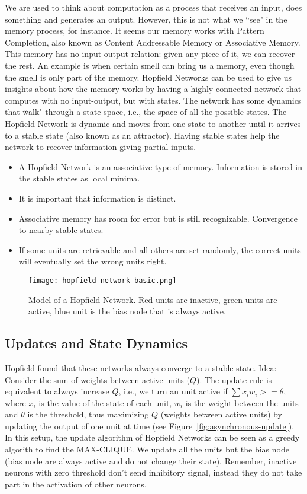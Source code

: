 \documentclass[main]{subfiles}
\begin{document}
We are used to think about computation as a process that receives an input, does something and generates an output.
However, this is not what we ``see" in the memory process, for instance.
It seems our memory works with Pattern Completion, also known as Content Addressable Memory or Associative Memory.
This memory has no input-output relation: given any piece of it, we can recover the rest.
An example is when certain smell can bring us a memory, even though the smell is only part of the memory.
Hopfield Networks can be used to give us insights about how the memory works by having a highly connected network that computes with no input-output, but with states.
The network has some dynamics that \"walk" through a state space, i.e., the space of all the possible states. The Hopfield Network is dynamic and moves from one state to another until it arrives to a stable state (also known as an attractor). Having stable states help the network to recover information giving partial inputs.


\begin{itemize}[noitemsep,nolistsep]
	\item A Hopfield Network is an associative type of memory. Information is stored in the stable states as local minima.
	\item It is important that information is distinct.
	\item Associative memory has room for error but is still recognizable. Convergence to nearby stable states.
	\item If some units are retrievable and all others are set randomly, the correct units will eventually set the wrong units right.
\end{itemize}

\begin{figure}[H]
	\centering
	\texttt{[image: hopfield-network-basic.png]}
	\caption{Model of a Hopfield Network. Red units are inactive, green units are active, blue unit is the bias node that is always active.}
\end{figure}

\subsection{Updates and State Dynamics}

Hopfield found that these networks always converge to a stable state.
Idea: Consider the sum of weights between active units ($Q$).
The update rule is equivalent to always increase $Q$, i.e., we turn an unit active if $\sum x_i w_i >= \theta$, where $x_i$ is the value of the state of each unit, $w_i$ is the weight between the units and $\theta$ is the threshold, thus maximizing $Q$ (weights between active units) by updating the output of one unit at time (see Figure~\ref{fig:asynchronous-update}).
In this setup, the update algorithm of Hopfield Networks can be seen as a greedy algorith to find the MAX-CLIQUE.
We update all the units but the bias node (bias node are always active and do not change their state).
Remember, inactive neurons with zero threshold don't send inhibitory signal, instead they do not take part in the activation of other neurons.
\end{document}
